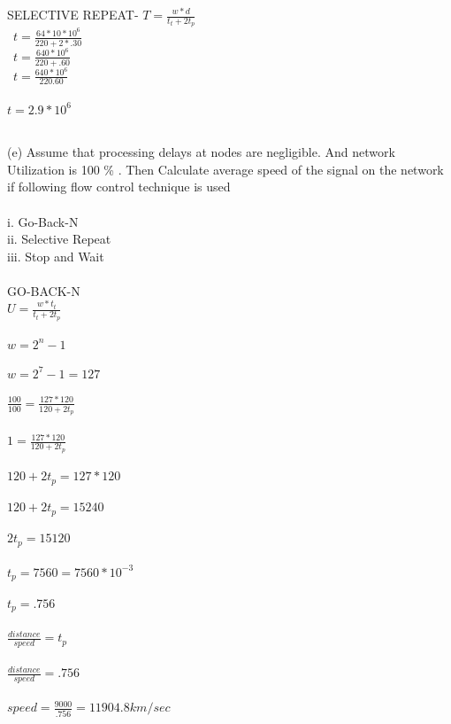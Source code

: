 \documentclass[a4paper,8pt]{article}
\begin{document}
SELECTIVE REPEAT-
$T=\frac{w*d}{t_{t}+2t_{p}}$\\\
$t=\frac{64*10*10^{6}}{220+2*.30}$\\\
$t=\frac{640*10^{6}}{220+.60}$\\\
$t=\frac{640*10^{6}}{220.60}$\\\\
$t=2.9*10^{6}$\\\

(e) Assume that processing delays at nodes are negligible. And network Utilization is
100 \% . Then Calculate average speed of the signal on the network if following flow
control technique is used\\\\
i. Go-Back-N\\
ii. Selective Repeat\\
iii. Stop and Wait\\\\
GO-BACK-N\\
$U=\frac{w*t_{t}}{t_{t}+2t_{p}}$\\\\
$w=2^{n}-1$\\\\
$w=2^{7}-1=127$\\\\
$\frac{100}{100}=\frac{127*120}{120+2t_{p}}$\\\\
$1=\frac{127*120}{120+2t_{p}}$\\\\
$120+2t_{p}=127*120$\\\\
$120+2t_{p}=15240$\\\\
$2t_{p}=15120$\\\\
$t_{p}=7560=7560*10^{-3}$\\\\
$t_{p}=.756$\\\\
$\frac{distance}{speed}=t_{p}$\\\\
$\frac{distance}{speed}=.756$\\\\
$speed=\frac{9000}{.756}=11904.8 km/sec$\\\\
\end{document}
